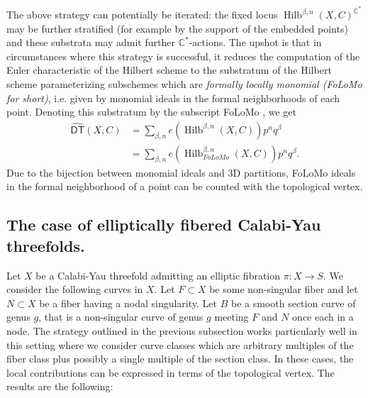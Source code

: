 \documentclass[12pt]{amsart}
\newcommand{\cnums} {{\mathbb C}}          %
\theoremstyle{definition}
\newcommand{\DThat}{\operatorname{\widehat{\mathsf{DT}}}}
\newcommand{\HilbBetan}{\operatorname{Hilb}^{\beta ,n}}
\newcommand{\folomo}{{FoLoMo }}
\begin{document}
The above strategy can potentially be iterated: the fixed locus
$\HilbBetan (X,C)^{\cnums^{*}}$ may be further stratified (for example
by the support of the embedded points) and these substrata may admit
further $\cnums^{*}$-actions. The upshot is that in circumstances
where this strategy is successful, it reduces the computation of the
Euler characteristic of the Hilbert scheme to the substratum of the
Hilbert scheme parameterizing subschemes which are \emph{formally
locally monomial ({\folomo } for short)}, i.e. given by monomial
ideals in the formal neighborhoods of each point. Denoting this
substratum by the subscript \folomo, we get
\begin{align*}
\DThat (X,C)&= \sum_{\beta ,n} e\left(\HilbBetan (X,C) \right) p^{n}q^{\beta }\\
&= \sum_{\beta ,n} e\left(\HilbBetan_{\folomo } (X,C) \right) p^{n}q^{\beta }.
\end{align*}
Due to the bijection between monomial ideals and 3D partitions,
\folomo ideals in the formal neighborhood of a point can be counted
with the topological vertex.


\subsection{The case of elliptically fibered Calabi-Yau threefolds.}

Let $X$ be a Calabi-Yau threefold admitting an elliptic fibration $\pi
:X\to S$. We consider the following curves in $X$. Let $F\subset X$ be
some non-singular fiber and let $N\subset X$ be a fiber having a nodal
singularity. Let $B$ be a smooth section curve of genus $g$, that is a
non-singular curve of genus $g$ meeting $F$ and $N$ once each in a
node. The strategy outlined in the previous subsection works
particularly well in this setting where we consider curve classes
which are arbitrary multiples of the fiber class plus possibly a
single multiple of the section class. In these cases, the local
contributions can be expressed in terms of the topological vertex. The
results are the following:
\end{document}
